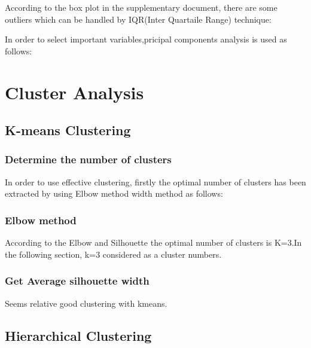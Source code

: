 \documentclass[
  11pt,
]{article}
\begin{document}
According to the box plot in the supplementary document, there are some
outliers which can be handled by IQR(Inter Quartaile Range) technique:

In order to select important variables,pricipal components analysis is
used as follows:

\hypertarget{cluster-analysis}{%
\section{Cluster Analysis}\label{cluster-analysis}}

\hypertarget{k-means-clustering}{%
\subsection{K-means Clustering}\label{k-means-clustering}}

\hypertarget{determine-the-number-of-clusters}{%
\subsubsection{Determine the number of
clusters}\label{determine-the-number-of-clusters}}

In order to use effective clustering, firstly the optimal number of
clusters has been extracted by using Elbow method width method as
follows:

\hypertarget{elbow-method}{%
\subsubsection{Elbow method}\label{elbow-method}}

According to the Elbow and Silhouette the optimal number of clusters is
K=3.In the following section, k=3 considered as a cluster numbers.

\hypertarget{get-average-silhouette-width}{%
\subsubsection{Get Average silhouette
width}\label{get-average-silhouette-width}}

Seems relative good clustering with kmeans.

\hypertarget{hierarchical-clustering}{%
\subsection{Hierarchical Clustering}\label{hierarchical-clustering}}
\end{document}
